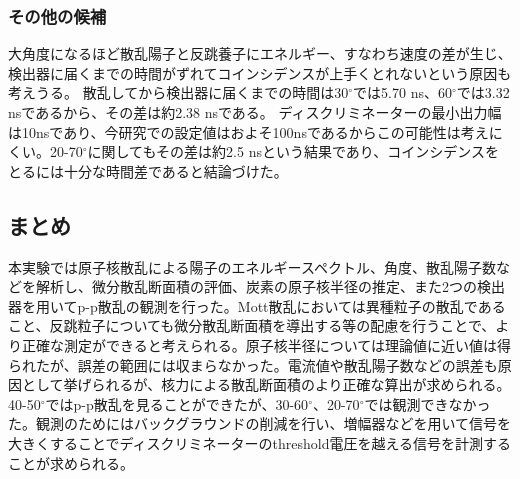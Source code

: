 \documentclass[a4paper,11pt,dvipdfmx]{jsarticle}
\begin{document}
 \subsubsection{その他の候補}
大角度になるほど散乱陽子と反跳養子にエネルギー、すなわち速度の差が生じ、検出器に届くまでの時間がずれてコインシデンスが上手くとれないという原因も考えうる。
散乱してから検出器に届くまでの時間は30$^{\circ}$では5.70 ns、60$^{\circ}$では3.32 nsであるから、その差は約2.38 nsである。
ディスクリミネーターの最小出力幅は10nsであり、今研究での設定値はおよそ100nsであるからこの可能性は考えにくい。20-70$^\circ$に関してもその差は約2.5 nsという結果であり、コインシデンスをとるには十分な時間差であると結論づけた。

 \subsection{まとめ}
本実験では原子核散乱による陽子のエネルギースペクトル、角度、散乱陽子数などを解析し、微分散乱断面積の評価、炭素の原子核半径の推定、また2つの検出器を用いてp-p散乱の観測を行った。Mott散乱においては異種粒子の散乱であること、反跳粒子についても微分散乱断面積を導出する等の配慮を行うことで、より正確な測定ができると考えられる。原子核半径については理論値に近い値は得られたが、誤差の範囲には収まらなかった。電流値や散乱陽子数などの誤差も原因として挙げられるが、核力による散乱断面積のより正確な算出が求められる。40-50$^\circ$ではp-p散乱を見ることができたが、30-60$^\circ$、20-70$^\circ$では観測できなかった。観測のためにはバックグラウンドの削減を行い、増幅器などを用いて信号を大きくすることでディスクリミネーターのthreshold電圧を越える信号を計測することが求められる。
\end{document}
